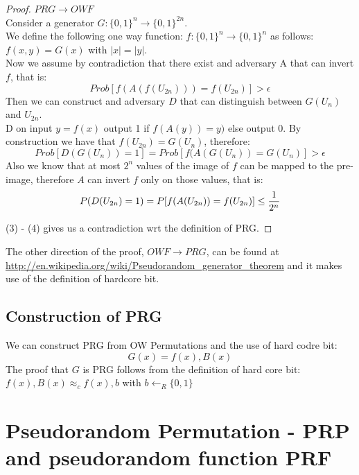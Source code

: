 \documentclass{article}
\begin{document}
\begin{proof}
$PRG \rightarrow OWF$\\
Consider a generator $G: \{0,1\}^n \rightarrow \{0,1\}^{2n}$.\\
We define the following one way function: $f: \{0,1\}^n \rightarrow \{0,1\}^n$ as follows: $f(x,y) = G(x)$ with $|x| = |y|$.\\
Now we assume by contradiction that there exist and adversary A that can invert $f$, that is:
\begin{equation}
Prob[f(A(f(U_{2n}))) = f(U_{2n})] > \epsilon
\end{equation}
Then we can construct and adversary $D$ that can distinguish between $G(U_n)$ and $U_{2n}$.\\
D on input $y = f(x)$ output 1 if $f(A(y)) = y)$ else output 0.
By construction we have that $f(U_{2n}) = G(U_n)$, therefore:
\begin{equation}
Prob[D(G(U_n))= 1] = Prob[f(A(G(U_n)) = G(U_n)] > \epsilon
\end{equation} 
Also we know that at most $2^n$ values of the image of $f$ can be mapped to the pre-image, therefore $A$ can invert $f$ only on those values, that is:
\begin{equation}
P(D(U_{2n})= 1) = P[f(A(U_{2n})) = f(U_{2n})] \leq {1 \over 2^n}
\end{equation}

(3) - (4) gives us a contradiction wrt the definition of PRG.
\end{proof}

The other direction of the proof, $OWF \rightarrow PRG$, can be found at \url{http://en.wikipedia.org/wiki/Pseudorandom_generator_theorem} and it makes use of the definition of hardcore bit. 

\subsection{Construction of PRG}
We can construct PRG from OW Permutations and the use of hard codre bit:
\begin{equation}
G(x) = f(x), B(x)
\end{equation}
The proof that $G$ is PRG follows from the definition of hard core bit: $f(x),B(x) \approx_c f(x), b$ with $b \leftarrow_R \{0,1\}$
 

\section{Pseudorandom Permutation - PRP and pseudorandom function PRF}
\end{document}
